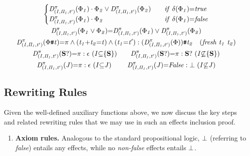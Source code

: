\documentclass[acmsmall,10pt,review]{acmart}
\newcommand{\effect}{\textcolor{black}{\ensuremath{\mathrm{\Phi}}}}
\newcommand{\choice}{\vee}
\newcommand{\code}[1]{{\tt{\ensuremath{\m{#1}}}}}
\newcommand{\empt}{\textcolor{black}{\ensuremath{\epsilon}}}
\newcommand{\bott}{\textcolor{black}{\ensuremath{\bot}}}
\newcommand{\m}{\mathit}
\newcommand{\mysharp}{{\mathrel{\texttt{\#}}}}
\begin{document}
{\begin{definition}
\begin{gather*}
{\begin{cases}
      \code{D^{\pi}_{(I, \Pi_1, t^\prime)}(   \effect_1) \cdot  \effect_2 \vee  D^{\pi}_{(I, \Pi_1, t^\prime)}( \effect_2)} \quad &\code{if\ \delta(\effect_1) {=} true}   \\
      \code{D^{\pi}_{(I, \Pi_1, t^\prime)}  ( \effect_1) \cdot  \effect_2} & \code{if\ \delta(\effect_1) {=} false} 
    \end{cases} 
    }
 \\
\code{D^{\pi}_{(I, \Pi_1, t^\prime)}(  \effect_1 \choice \effect_2) } {=} \code{ D^{\pi}_{(I, \Pi_1, t^\prime)}(  \effect_1) \choice D^{\pi}_{(I, \Pi_1, t^\prime)}(  \effect_2)} 
\\
\code{D^{\pi}_{(I, \Pi_1, t^\prime)}(  \effect \mysharp  t) } {=}
\code{
\pi \wedge(t_1{+} t_2 {=}t) \wedge (t_1{=}t^\prime) : (D^{\pi}_{(I, \Pi_1, t^\prime)}(\effect))\mysharp  t_2} \ \ \ 
\code{(fresh \ t_1\ t_2 )}
\\
\code{D^{\pi}_{(I, \Pi_1, t^\prime)}(\textbf{S}?)} {=} \code{\pi: \empt\ (}\code{ I {\subseteq} \{\textbf{S}\})}
\qquad
\code{D^{\pi}_{(I, \Pi_1, t^\prime)}(\textbf{S}?)} {=} \code{\pi: \textbf{S}?\ (}\code{ I {\not\subseteq} \{\textbf{S}\})}
\\
\code{D^{\pi}_{(I, \Pi_1, t^\prime)}(J)} {=} \code{\pi: \empt\ (}\code{ I {\subseteq} J)}
\qquad\ 
    \code{D^{\pi}_{(I, \Pi_1, t^\prime)}( J)} {=} \code{False : \bott \ (}\code{I {\not\subseteq} J)} 
\end{gather*}
\end{definition}




\subsection{Rewriting Rules}
\label{InferenceRules}
Given the well-defined auxiliary functions above, we now discuss the key steps and related rewriting rules that we may use in such an effects inclusion proof.  


\begin{enumerate}
\item 
\textbf{Axiom rules.}
\label{Base}
Analogous to  the standard propositional logic, \code{\bott} (referring to \textit{false}) entails any effects, while no \textit{non-false} effects entails \code{\bott}.



\end{enumerate}}
\end{document}
